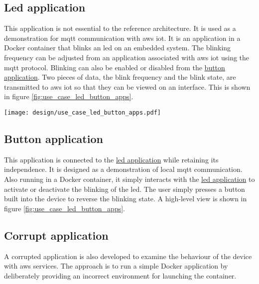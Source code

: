 \subsection{Led application}
This application is not essential to the reference architecture. It is used as a demonstration for \acrshort{mqtt} communication with \gls{aws} \acrshort{iot}. It is an application in a Docker container that blinks an led on an embedded system. The blinking frequency can be adjusted from an application associated with \gls{aws} \acrshort{iot} using the \acrshort{mqtt} protocol. Blinking can also be enabled or disabled from the \hyperref[subsec:button_app]{button application}. Two pieces of data, the blink frequency and the blink state, are transmitted to \gls{aws} \acrshort{iot} so that they can be viewed on an interface. This is shown in figure \ref{fig:use_case_led_button_apps}.
\begin{center}
    \begingroup
    \texttt{[image: design/use\_case\_led\_button\_apps.pdf]}
    \label{fig:use_case_led_button_apps}
    \endgroup
\end{center}

\subsection{Button application}
\label{subsec:button_app}
This application is connected to the \hyperref[subsec:led_app]{led application} while retaining its independence. It is designed as a demonstration of local \acrshort{mqtt} communication. Also running in a Docker container, it simply interacts with the \hyperref[subsec:led_app]{led application} to activate or deactivate the blinking of the led. The user simply presses a button built into the device to reverse the blinking state. A high-level view is shown in figure \ref{fig:use_case_led_button_apps}.

\subsection{Corrupt application}
A corrupted application is also developed to examine the behaviour of the device with \gls{aws} services. The approach is to run a simple Docker application by deliberately providing an incorrect environment for launching the container.